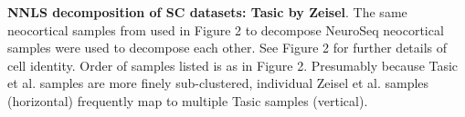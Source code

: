 \textbf{NNLS decomposition of SC datasets: Tasic by Zeisel}. The same neocortical samples from \citep{Tasic_2018,Zeisel_2018} used in Figure 2 to decompose NeuroSeq neocortical samples were used to decompose each other. See Figure 2 for further details of cell identity. Order of samples listed is as in Figure 2. Presumably because Tasic et al. samples are more finely sub-clustered, individual Zeisel et al. samples (horizontal) frequently map to multiple Tasic samples (vertical).